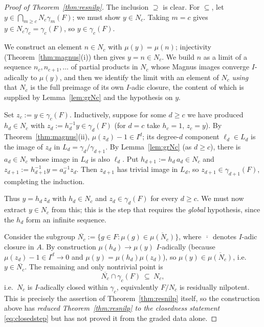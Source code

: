 \documentclass{amsart}
\theoremstyle{definition}
\theoremstyle{remark}
\begin{document}
\begin{proof}[Proof of Theorem~\ref{thm:resnilp}]
The inclusion $\supseteq$ is clear. For $\subseteq$, let
$y\in\bigcap_{m\ge c}N_c\gamma_m(F)$; we must show $y\in N_c$. Taking $m=c$ gives
$y\in N_c\gamma_c=\gamma_c(F)$, so $y\in\gamma_c(F)$.

We construct an element $n\in N_c$ with $\mu(y)=\mu(n)$; injectivity
(Theorem~\ref{thm:magnus}(i)) then gives $y=n\in N_c$. We build $n$ as a limit of a
sequence $n_c,n_{c+1},\dots$ of partial products in $N_c$ whose Magnus images
converge $I$-adically to $\mu(y)$, and then we identify the limit with an element of
$N_c$ \emph{using} that $N_c$ is the full preimage of its own $I$-adic closure, the
content of which is supplied by Lemma~\ref{lem:grNc} and the hypothesis on $y$.

Set $z_c:=y\in\gamma_c(F)$. Inductively, suppose for some $d\ge c$ we have produced
$h_d\in N_c$ with $z_d:=h_d^{-1}y\in\gamma_d(F)$ (for $d=c$ take $h_c=1$, $z_c=y$).
By Theorem~\ref{thm:magnus}(ii), $\mu(z_d)-1\in I^{d}$; its degree-$d$ component
$\ell_d\in L_d$ is the image of $z_d$ in $L_d=\gamma_d/\gamma_{d+1}$. By
Lemma~\ref{lem:grNc} (as $d\ge c$), there is $a_d\in N_c$ whose image in $L_d$ is
also $\ell_d$. Put $h_{d+1}:=h_d\,a_d\in N_c$ and
$z_{d+1}:=h_{d+1}^{-1}y=a_d^{-1}z_d$. Then $z_{d+1}$ has trivial image in $L_d$, so
$z_{d+1}\in\gamma_{d+1}(F)$, completing the induction.

Thus $y=h_d\,z_d$ with $h_d\in N_c$ and $z_d\in\gamma_d(F)$ for every $d\ge c$. We
must now extract $y\in N_c$ from this; this is the step that requires the
\emph{global} hypothesis, since the $h_d$ form an infinite sequence.

Consider the subgroup $\overline{N_c}:=\{g\in F:\mu(g)\in\overline{\mu(N_c)}\}$,
where $\overline{\,\cdot\,}$ denotes $I$-adic closure in $A$. By construction
$\mu(h_d)\to\mu(y)$ $I$-adically (because $\mu(z_d)-1\in I^{d}\to 0$ and
$\mu(y)=\mu(h_d)\mu(z_d)$), so $\mu(y)\in\overline{\mu(N_c)}$, i.e.\
$y\in\overline{N_c}$. The remaining and only nontrivial point is
\begin{equation}\label{eq:closedstep}
\overline{N_c}\cap\gamma_c(F)\ \subseteq\ N_c ,
\end{equation}
i.e.\ $N_c$ is $I$-adically closed within $\gamma_c$, equivalently
$F/N_c$ is residually nilpotent. This is precisely the assertion of
Theorem~\ref{thm:resnilp} itself, so the construction above has \emph{reduced
Theorem~\ref{thm:resnilp} to the closedness statement} \eqref{eq:closedstep} but has
not proved it from the graded data alone.


\end{proof}
\end{document}
